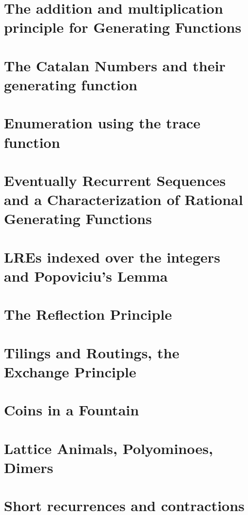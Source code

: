 \section{The addition and multiplication principle for Generating Functions}

\section{The Catalan Numbers and their generating function}

\section{Enumeration using the trace function}

\section{Eventually Recurrent Sequences and a Characterization of Rational Generating Functions}

\section{LREs indexed over the integers and Popoviciu's Lemma}

\section{The Reflection Principle}

\section{Tilings and Routings, the Exchange Principle}

\section{Coins in a Fountain}

\section{Lattice Animals, Polyominoes, Dimers}

\section{Short recurrences and contractions}

